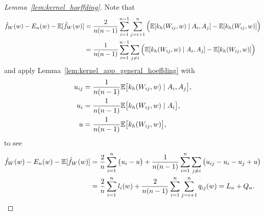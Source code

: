 \begin{proof}[Lemma~\ref{lem:kernel_hoeffding}]


  Note that
  \begin{align*}
    \hat f_W(w)
    - E_n(w)
    - \mathbb{E}[\hat f_W(w)]
    &=
    \frac{2}{n(n-1)}
    \sum_{i=1}^{n-1}
    \sum_{j=i+1}^{n}
    \Big(
      \mathbb{E}[k_h(W_{i j},w) \mid A_i, A_j]
      - \mathbb{E}[k_h(W_{i j},w)]
    \Big) \\
    &=
    \frac{1}{n(n-1)}
    \sum_{i=1}^{n-1}
    \sum_{j \neq i}
    \Big(
      \mathbb{E}[k_h(W_{i j},w) \mid A_i, A_j]
      - \mathbb{E}[k_h(W_{i j},w)]
    \Big)
  \end{align*}
  and apply Lemma~\ref{lem:kernel_app_general_hoeffding} with
  \begin{align*}
    u_{i j}
    &=
    \frac{1}{n(n-1)}
    \mathbb{E}\big[k_h(W_{i j},w) \mid A_i, A_j\big], \\
    u_i
    &=
    \frac{1}{n(n-1)}
    \mathbb{E}\big[k_h(W_{i j},w) \mid A_i\big], \\
    u
    &=
    \frac{1}{n(n-1)}
    \mathbb{E}\big[k_h(W_{i j},w)\big],
  \end{align*}
  to see
  \begin{align*}
    \hat f_W(w)
    - E_n(w)
    - \mathbb{E}[\hat f_W(w)]
    &=
    \frac{2}{n}
    \sum_{i=1}^n
    \big(u_i - u\big)
    + \frac{1}{n(n-1)}
    \sum_{i=1}^n
    \sum_{j \neq i}
    \big(
      u_{i j} - u_i - u_j + u
    \big) \\
    &=
    \frac{2}{n}
    \sum_{i=1}^n
    l_i(w)
    + \frac{2}{n(n-1)}
    \sum_{i=1}^n
    \sum_{j = i+1}^n
    q_{i j}(w)
    =
    L_n + Q_n.
  \end{align*}



\end{proof}
